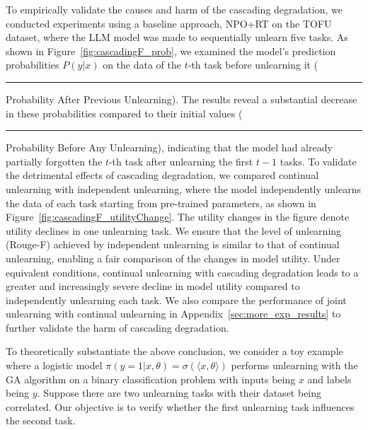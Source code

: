 \documentclass{article}
\theoremstyle{plain}
\theoremstyle{definition}
\theoremstyle{remark}
\begin{document}
To empirically validate the causes and harm of the cascading degradation, we conducted experiments using a baseline approach, NPO+RT on the TOFU dataset, where the LLM model was made to sequentially unlearn five tasks.
As shown in Figure~\ref{fig:cascadingF_prob}, we examined the model’s prediction probabilities $P(y|x)$ on the data of the $t$-th task before unlearning it (\textcolor[HTML]{218380}{\rule{7pt}{7pt}} Probability After Previous Unlearning).
The results reveal a substantial decrease in these probabilities compared to their initial values (\textcolor[HTML]{73D2DE}{\rule{7pt}{7pt}} Probability Before Any Unlearning), indicating that the model had already partially forgotten the $t$-th task after unlearning the first $t-1$ tasks.
To validate the detrimental effects of cascading degradation, we compared continual unlearning with independent unlearning, where the model independently unlearns the data of each task starting from pre-trained parameters, as shown in Figure~\ref{fig:cascadingF_utilityChange}.
The utility changes in the figure denote utility declines in one unlearning task.
We ensure that the level of unlearning (Rouge-F) achieved by independent
unlearning is similar to that of continual unlearning, enabling a fair comparison of the changes in model utility.
Under equivalent conditions, continual unlearning with cascading degradation leads to a greater and increasingly severe decline in model utility compared to independently unlearning each task.
We also compare the performance of joint unlearning with continual unlearning in Appendix~\ref{sec:more_exp_results} to further validate the harm of cascading degradation.



To theoretically substantiate the above conclusion, we consider a toy example where a logistic model $\pi(y=1|x,\theta)=\sigma(\langle x,\theta\rangle)$ performs unlearning with the GA algorithm on a binary classification problem with inputs being $x$ and labels being $y$.
Suppose there are two unlearning tasks with their dataset being correlated.
Our objective is to verify whether the first unlearning task influences the second task.
\end{document}
